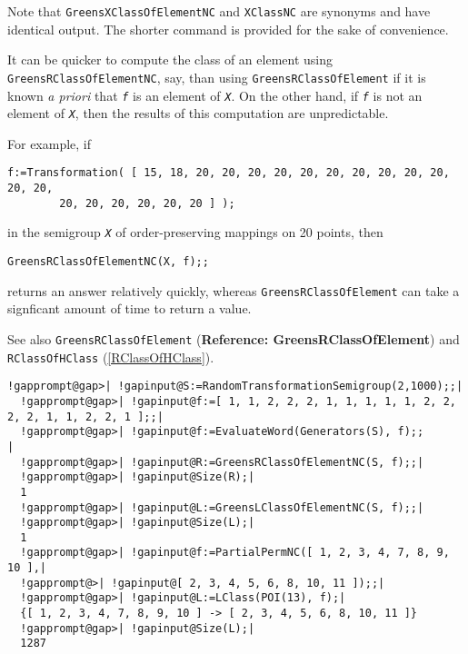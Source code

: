 \documentclass[a4paper,11pt]{report}
\begin{document}
{{{ Note that \texttt{GreensXClassOfElementNC} and \texttt{XClassNC} are synonyms and have identical output. The shorter command is provided for
the sake of convenience. 

 It can be quicker to compute the class of an element using \texttt{GreensRClassOfElementNC}, say, than using \texttt{GreensRClassOfElement} if it is known \emph{a priori} that \mbox{\texttt{\mdseries\slshape f}} is an element of \mbox{\texttt{\mdseries\slshape X}}. On the other hand, if \mbox{\texttt{\mdseries\slshape f}} is not an element of \mbox{\texttt{\mdseries\slshape X}}, then the results of this computation are unpredictable.

 For example, if 
\begin{Verbatim}[commandchars=!@|,fontsize=\small,frame=single,label=Example]
  f:=Transformation( [ 15, 18, 20, 20, 20, 20, 20, 20, 20, 20, 20, 20, 20, 20, 
        20, 20, 20, 20, 20, 20 ] );
\end{Verbatim}
 in the semigroup \mbox{\texttt{\mdseries\slshape X}} of order-preserving mappings on 20 points, then 
\begin{Verbatim}[commandchars=!@|,fontsize=\small,frame=single,label=Example]
  GreensRClassOfElementNC(X, f);;
\end{Verbatim}
 returns an answer relatively quickly, whereas \texttt{GreensRClassOfElement} can take a signficant amount of time to return a value.

 See also \texttt{GreensRClassOfElement} (\textbf{Reference: GreensRClassOfElement}) and \texttt{RClassOfHClass} (\ref{RClassOfHClass}). 
\begin{Verbatim}[commandchars=!@|,fontsize=\small,frame=single,label=Example]
  !gapprompt@gap>| !gapinput@S:=RandomTransformationSemigroup(2,1000);;|
  !gapprompt@gap>| !gapinput@f:=[ 1, 1, 2, 2, 2, 1, 1, 1, 1, 1, 2, 2, 2, 2, 1, 1, 2, 2, 1 ];;|
  !gapprompt@gap>| !gapinput@f:=EvaluateWord(Generators(S), f);;                            |
  !gapprompt@gap>| !gapinput@R:=GreensRClassOfElementNC(S, f);;|
  !gapprompt@gap>| !gapinput@Size(R);|
  1
  !gapprompt@gap>| !gapinput@L:=GreensLClassOfElementNC(S, f);;|
  !gapprompt@gap>| !gapinput@Size(L);|
  1 
  !gapprompt@gap>| !gapinput@f:=PartialPermNC([ 1, 2, 3, 4, 7, 8, 9, 10 ],|
  !gapprompt@>| !gapinput@[ 2, 3, 4, 5, 6, 8, 10, 11 ]);;|
  !gapprompt@gap>| !gapinput@L:=LClass(POI(13), f);|
  {[ 1, 2, 3, 4, 7, 8, 9, 10 ] -> [ 2, 3, 4, 5, 6, 8, 10, 11 ]}
  !gapprompt@gap>| !gapinput@Size(L);|
  1287
\end{Verbatim}
 }

}}
\end{document}
